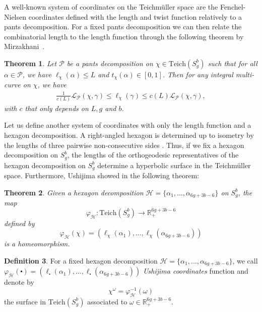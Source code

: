 \documentclass[a4paper,12pt]{article}
\newtheorem{theorem}{Theorem}[section]
\theoremstyle{definition}
\newtheorem{definition}[theorem]{Definition}
\theoremstyle{remark}
\begin{document}
A well-known system of coordinates on the Teichmüller space are the Fenchel-Nielsen coordinates defined with the length and twist function relatively to a pants decomposition. For a fixed pants decomposition we can then relate the combinatorial length to the length function through the following theorem by Mirzakhani~\cite[Proposition~3.5]{mirzakhani}. 
\begin{theorem}
    Let $\mathcal{P}$ be a pants decomposition on $\chi \in \mathrm{Teich}(S_g^b)$ such that for all $\alpha \in \mathcal{P}$, we have $\ell_\chi(\alpha) \leqslant L$ and $t_\chi(\alpha) \in [0,1]$. Then for any integral multi-curve on $\chi$, we have
    \begin{align}
        \frac{1}{c(L)}\mathcal{L}_\mathcal{P}(\chi,\gamma) \leqslant \ell_\chi(\gamma) \leqslant c(L) \mathcal{L}_\mathcal{P}(\chi,\gamma),\label{in:combiLength}
    \end{align}
    with $c$ that only depends on $L, g$ and $b$.
\end{theorem}

Let us define another system of coordinates with only the length function and a hexagon decomposition. A right-angled hexagon is determined up to isometry by the lengths of three pairwise non-consecutive sides \cite[Theorem 3.5.14]{Rat}. Thus, if we fix a hexagon decomposition on $S_g^b$, the lengths of the orthogeodesic representatives of the hexagon decomposition on $S_g^b$ determine a hyperbolic surface in the Teichmüller space. 
Furthermore, Ushijima showed in \cite[Theorem 4.1]{Akira} the following theorem:

\begin{theorem}\label{HexaCoord}
    Given a hexagon decomposition $\mathcal{H}=\{\alpha_1,...,\alpha_{6g+3b-6}\}$ on $S_g^b$, the map
    \[
        \varphi_{\mathcal{H}} : \mathrm{Teich}(S_g^b) \to  \mathbb{R}^{6g+3b-6}_+
    \]
    defined by
    \[
        \varphi_{\mathcal{H}}(\chi)=(\ell_{\chi}(\alpha_1),...,\ell_{\chi}(\alpha_{6g+3b-6})) 
    \]
    is a homeomorphism.
\end{theorem}



\begin{definition}\label{def:omegaSurface}
    For a fixed hexagon decomposition $ \mathcal{H} = \{\alpha_1,...,\alpha_{6g+3b-6}\}$, we call \\
    $\varphi_{\mathcal{H}}(\centerdot)=(\ell_{\centerdot}(\alpha_1),...,\ell_{\centerdot}(\alpha_{6g+3b-6}))$ \textit{Ushijima coordinates} function and denote by 
    \[
      \chi^{\omega}=\varphi_{\mathcal{H}}^{-1}(\omega)   
    \] 
    the surface in $\mathrm{Teich}(S_g^b)$ associated to $\omega \in \mathbb{R}_+^{6g+3b-6}$.
\end{definition}
\end{document}
